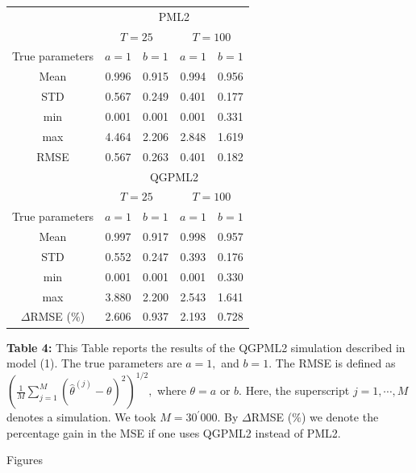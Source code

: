 \documentclass[a4paper, 12pt, oneside]{Thesis}
\begin{document}
\begin{center}
{ 
\begin{tabular}{c|cc|cc}
& \multicolumn{4}{c}{PML2} \\ 
& \multicolumn{2}{c}{$T=25$} & \multicolumn{2}{c}{$T=100$} \\ 
True parameters & $a=1$ & $b=1$ & $a=1$ & $b=1$ \\ 
Mean & 0.996 & 0.915 & 0.994 & 0.956 \\ 
STD & 0.567 & 0.249 & 0.401 & 0.177 \\ 
min & 0.001 & 0.001 & 0.001 & 0.331 \\ 
max & 4.464 & 2.206 & 2.848 & 1.619 \\ 
RMSE & 0.567 & 0.263 & 0.401 & 0.182 \\[+2ex] 
& \multicolumn{4}{c}{QGPML2} \\ 
& \multicolumn{2}{c}{$T=25$} & \multicolumn{2}{c}{$T=100$} \\ 
True parameters & $a=1$ & $b=1$ & $a=1$ & $b=1$ \\ 
Mean & 0.997 & 0.917 & 0.998 & 0.957 \\ 
STD & 0.552 & 0.247 & 0.393 & 0.176 \\ 
min & 0.001 & 0.001 & 0.001 & 0.330 \\ 
max & 3.880 & 2.200 & 2.543 & 1.641 \\ 
$\Delta$RMSE ($\%$) & 2.606 & 0.937 & 2.193 & 0.728%
\end{tabular}
}
\end{center}

{ \vspace*{0.2cm}\textbf{Table 4:} This Table reports the results
of the QGPML2 simulation described in model (1). The true
parameters are $a=1,$ and $b=1.$ The RMSE is defined
as $\left(\frac{1}{M}\sum_{j=1}^M(\hat\theta^{(j)}-\theta)^2\right)^{1/2},$
where $\theta=a$ or $b.$ Here, the superscript $j=1,\cdots,M$ denotes a
simulation. We took $M=30^{\prime}000.$ By $\Delta$RMSE ($\%$) we denote the
percentage gain in the MSE if one uses QGPML2 instead of PML2. }

\clearpage\newpage
\begin{center}
{\Huge Figures}
\end{center}
\end{document}
